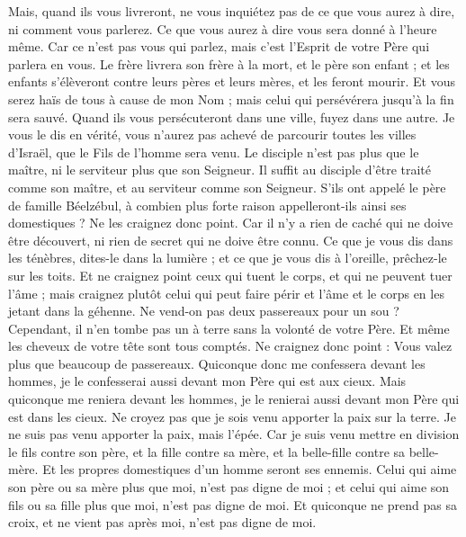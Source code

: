 \begin{multicols}{2}
{Mais, quand ils vous livreront, ne vous inquiétez pas de ce que vous aurez à dire, ni comment vous parlerez. Ce que vous aurez à dire vous sera donné à l’heure même.
Car ce n'est pas vous qui parlez, mais c'est l'Esprit de votre Père qui parlera en vous.
Le frère livrera son frère à la mort, et le père son enfant ; et les enfants s'élèveront contre leurs pères et leurs mères, et les feront mourir.
Et vous serez haïs de tous à cause de mon Nom ; mais celui qui persévérera jusqu’à la fin sera sauvé.
Quand ils vous persécuteront dans une ville, fuyez dans une autre. Je vous le dis en vérité, vous n'aurez pas achevé de parcourir toutes les villes d'Israël, que le Fils de l'homme sera venu.
Le disciple n'est pas plus que le maître, ni le serviteur plus que son Seigneur.
Il suffit au disciple d'être traité comme son maître, et au serviteur comme son Seigneur. S’ils ont appelé le père de famille Béelzébul, à combien plus forte raison appelleront-ils ainsi ses domestiques ?
Ne les craignez donc point. Car il n'y a rien de caché qui ne doive être découvert, ni rien de secret qui ne doive être connu.
Ce que je vous dis dans les ténèbres, dites-le dans la lumière ; et ce que je vous dis à l'oreille, prêchez-le sur les toits.
Et ne craignez point ceux qui tuent le corps, et qui ne peuvent tuer l'âme ; mais craignez plutôt celui qui peut faire périr et l'âme et le corps en les jetant dans la géhenne.
Ne vend-on pas deux passereaux pour un sou ? Cependant, il n’en tombe pas un à terre sans la volonté de votre Père.
Et même les cheveux de votre tête sont tous comptés.
Ne craignez donc point : Vous valez plus que beaucoup de passereaux.
Quiconque donc me confessera devant les hommes, je le confesserai aussi devant mon Père qui est aux cieux.
Mais quiconque me reniera devant les hommes, je le renierai aussi devant mon Père qui est dans les cieux.
Ne croyez pas que je sois venu apporter la paix sur la terre. Je ne suis pas venu apporter la paix, mais l'épée.
Car je suis venu mettre en division le fils contre son père, et la fille contre sa mère, et la belle-fille contre sa belle-mère.
Et les propres domestiques d'un homme seront ses ennemis.
Celui qui aime son père ou sa mère plus que moi, n'est pas digne de moi ; et celui qui aime son fils ou sa fille plus que moi, n'est pas digne de moi.
Et quiconque ne prend pas sa croix, et ne vient pas après moi, n'est pas digne de moi.
}
\end{multicols}
